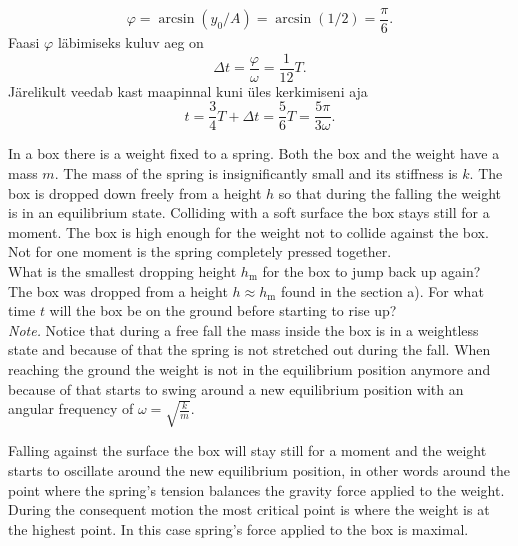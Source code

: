 {\[
\varphi = \arcsin(y_0/A) = \arcsin(1/2) = \frac{\pi}{6}.
\]
Faasi $\varphi$ läbimiseks kuluv aeg on
\[
\Delta t = \frac{\varphi}{\omega}=\frac{1}{12}T.
\]
Järelikult veedab kast maapinnal kuni üles kerkimiseni aja
\[
t = \frac{3}{4}T + \Delta t = \frac{5}{6}T = \frac{5\pi}{3\omega}.
\]
\fi


\ifEngStatement
In a box there is a weight fixed to a spring. Both the box and the weight have a mass $m$. The mass of the spring is insignificantly small and its stiffness is $k$. The box is dropped down freely from a height $h$ so that during the falling the weight is in an equilibrium state. Colliding with a soft surface the box stays still for a moment. The box is high enough for the weight not to collide against the box. Not for one moment is the spring completely pressed together.\\
\osa What is the smallest dropping height $h_\text{m}$ for the box to jump back up again?\\
\osa The box was dropped from a height $h\approx h_\text{m}$ found in the section a). For what time $t$ will the box be on the ground before starting to rise up?\\
\emph{Note.} Notice that during a free fall the mass inside the box is in a weightless state and because of that the spring is not stretched out during the fall. When reaching the ground the weight is not in the equilibrium position anymore and because of that starts to swing around a new equilibrium position with an angular frequency of $\omega =\sqrt{\frac{k}{m}}$.
\fi


\ifEngHint
Falling against the surface the box will stay still for a moment and the weight starts to oscillate around the new equilibrium position, in other words around the point where the spring’s tension balances the gravity force applied to the weight. During the consequent motion the most critical point is where the weight is at the highest point. In this case spring’s force applied to the box is maximal.
\fi


}
